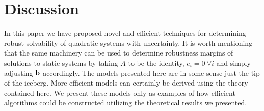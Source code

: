 \section{Discussion} \label{sec:disc}

In this paper we have proposed novel and efficient techniques for determining robust solvability of quadratic systems with uncertainty. 
It is worth mentioning that the same machinery can be used to determine robustness margins of solutions to static systems by taking $A$ to be the identity, $e_i=0 \ \forall i$ and simply adjusting $\bold b$ accordingly. 
The models presented here are in some sense just the tip of the iceberg. 
More efficient models can certainly be derived using the theory contained here. 
We present these models only as examples of how efficient algorithms could be constructed utilizing the theoretical results we presented. 
